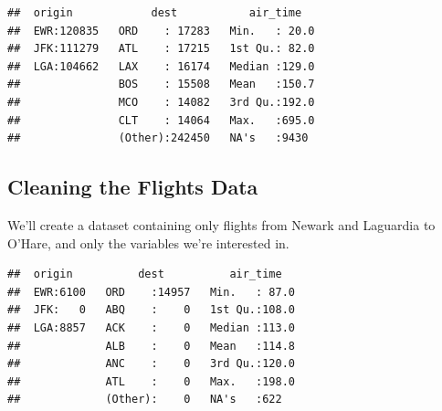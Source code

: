 \documentclass[]{book}
\newenvironment{Shaded}{\begin{snugshade}}{\end{snugshade}}
\newcommand{\KeywordTok}[1]{\textcolor[rgb]{0.13,0.29,0.53}{\textbf{#1}}}
\newcommand{\StringTok}[1]{\textcolor[rgb]{0.31,0.60,0.02}{#1}}
\newcommand{\OperatorTok}[1]{\textcolor[rgb]{0.81,0.36,0.00}{\textbf{#1}}}
\newcommand{\NormalTok}[1]{#1}
\begin{document}
\begin{Shaded}
\end{Shaded}

\begin{verbatim}
##  origin            dest           air_time    
##  EWR:120835   ORD    : 17283   Min.   : 20.0  
##  JFK:111279   ATL    : 17215   1st Qu.: 82.0  
##  LGA:104662   LAX    : 16174   Median :129.0  
##               BOS    : 15508   Mean   :150.7  
##               MCO    : 14082   3rd Qu.:192.0  
##               CLT    : 14064   Max.   :695.0  
##               (Other):242450   NA's   :9430
\end{verbatim}

\subsection{Cleaning the Flights Data}\label{cleaning-the-flights-data}

We'll create a dataset containing only flights from Newark and Laguardia
to O'Hare, and only the variables we're interested in.

\begin{Shaded}
\end{Shaded}

\begin{verbatim}
##  origin          dest          air_time    
##  EWR:6100   ORD    :14957   Min.   : 87.0  
##  JFK:   0   ABQ    :    0   1st Qu.:108.0  
##  LGA:8857   ACK    :    0   Median :113.0  
##             ALB    :    0   Mean   :114.8  
##             ANC    :    0   3rd Qu.:120.0  
##             ATL    :    0   Max.   :198.0  
##             (Other):    0   NA's   :622
\end{verbatim}
\end{document}

